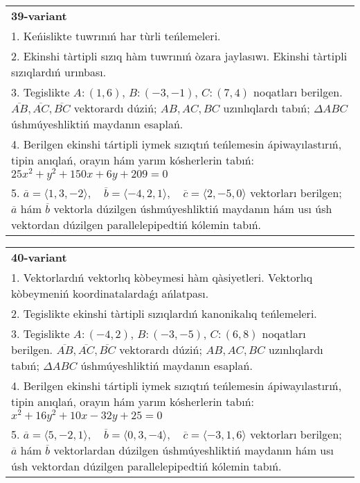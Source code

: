 \documentclass{article}
\begin{document}
\begin{tabular}{m{17cm}}
\textbf{39-variant}\\
1. Keńislikte tuwrınıń har tùrli teńlemeleri. \\

2. Ekinshi tàrtipli sızıq hàm tuwrınıń òzara jaylasıwı. Ekinshi tàrtipli sızıqlardıń urınbası.\\

3. Tegislikte $A: (1, 6)$, $B: (-3, -1)$, $C: (7, 4)$ noqatları berilgen. $\overline{AB}, \overline{AC}, \overline{BC}$ vektorardı dúziń; $AB, AC, BC$ uzınlıqlardı tabıń; $\Delta ABC$ úshmúyeshliktiń maydanın esaplań. \\

4. Berilgen ekinshi tártipli iymek sızıqtıń teńlemesin ápiwayılastırıń, tipin anıqlań, orayın hám yarım kósherlerin tabıń: $25x^2+y^2+150x+6y+209=0$\\

5. \(\overline{a} = \langle 1, 3, -2 \rangle, \quad \overline{b} = \langle -4, 2, 1 \rangle, \quad \overline{c} = \langle 2, -5, 0 \rangle\) vektorları berilgen; \(\overline{a}\) hám \(\overline{b}\) vektorla dúzilgen úshmúyeshliktiń maydanın hám usı úsh vektordan dúzilgen parallelepipedtiń kólemin tabıń.
\end{tabular}
\vspace{1cm}


\begin{tabular}{m{17cm}}
\textbf{40-variant}\\
1. Vektorlardıń vektorlıq kòbeymesi hàm qàsiyetleri. Vektorlıq kòbeymeniń koordinatalardaǵı ańlatpası. \\

2. Tegislikte ekinshi tàrtipli sızıqlardıń kanonikalıq teńlemeleri.\\

3. Tegislikte $A: (-4, 2)$, $B: (-3, -5)$, $C: (6, 8)$ noqatları berilgen. $\overline{AB}, \overline{AC}, \overline{BC}$ vektorardı dúziń; $AB, AC, BC$ uzınlıqlardı tabıń; $\Delta ABC$ úshmúyeshliktiń maydanın esaplań. \\

4. Berilgen ekinshi tártipli iymek sızıqtıń teńlemesin ápiwayılastırıń, tipin anıqlań, orayın hám yarım kósherlerin tabıń: $x^2+16y^2+10x-32y+25=0$\\

5. \(\overline{a} = \langle 5, -2, 1 \rangle, \quad \overline{b} = \langle 0, 3, -4 \rangle, \quad \overline{c} = \langle -3, 1, 6 \rangle\) vektorları berilgen; \(\overline{a}\) hám \(\overline{b}\) vektorlardan dúzilgen úshmúyeshliktiń maydanın hám usı úsh vektordan dúzilgen parallelepipedtiń kólemin tabıń.
\end{tabular}
\vspace{1cm}
\end{document}
